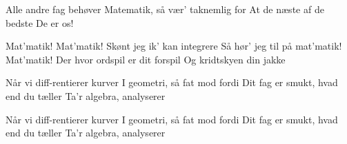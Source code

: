 \documentclass[a4paper,11pt]{article}
\begin{document}
\begin{song}
 Alle andre fag behøver
Matematik, så vær' taknemlig for
At de næste af de bedste
De er os!

 Mat'matik! Mat'matik!
Skønt jeg ik' kan integrere
Så hør' jeg til på mat'matik! Mat'matik!
Der hvor ordspil er dit forspil
Og kridtskyen din jakke

 Når vi diff-rentierer kurver
I geometri, så fat mod fordi
Dit fag er smukt, hvad end du tæller
Ta'r algebra, analyserer

 Når vi diff-rentierer kurver
I geometri, så fat mod fordi
Dit fag er smukt, hvad end du tæller
Ta'r algebra, analyserer
\end{song}
\end{document}
